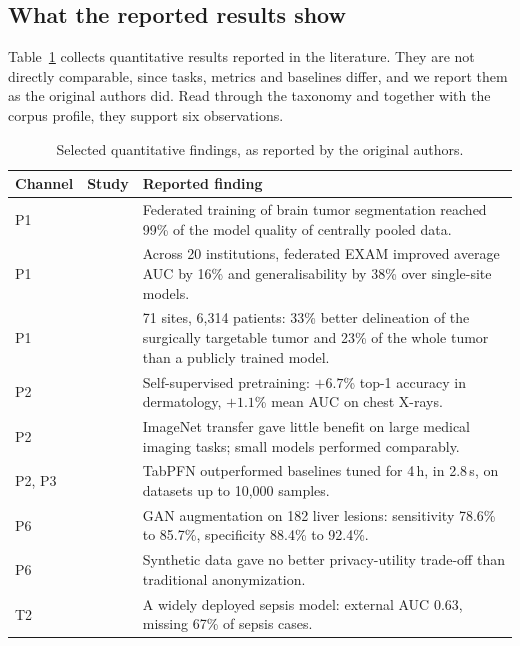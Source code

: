 \documentclass[acmsmall,screen,review]{acmart}
\theoremstyle{acmdefinition}
\begin{document}
\subsection{What the reported results show}\label{sec:S7_2}

Table~\ref{tab:evidence} collects quantitative results reported in the literature. They are not directly comparable, since tasks, metrics and baselines differ, and we report them as the original authors did. Read through the taxonomy and together with the corpus profile, they support six observations.

\begin{table}[t]
\caption{Selected quantitative findings, as reported by the original authors.}
\label{tab:evidence}
\footnotesize
\begin{tabularx}{\linewidth}{@{}p{1.15cm}>{\raggedright\arraybackslash}p{2.6cm}X@{}}
\toprule
Channel & Study & Reported finding\\
\midrule
P1 & \citet{sheller2020federated} & Federated training of brain tumor segmentation reached 99\% of the model quality of centrally pooled data.\\
P1 & \citet{dayan2021federated} & Across 20 institutions, federated EXAM improved average AUC by 16\% and generalisability by 38\% over single-site models.\\
P1 & \citet{pati2022federated} & 71 sites, 6,314 patients: 33\% better delineation of the surgically targetable tumor and 23\% of the whole tumor than a publicly trained model.\\
P2 & \citet{azizi2021big} & Self-supervised pretraining: $+6.7$\% top-1 accuracy in dermatology, $+1.1$\% mean AUC on chest X-rays.\\
P2 & \citet{raghu2019transfusion} & ImageNet transfer gave little benefit on large medical imaging tasks; small models performed comparably.\\
P2, P3 & \citet{hollmann2025accurate} & TabPFN outperformed baselines tuned for 4\,h, in 2.8\,s, on datasets up to 10,000 samples.\\
P6 & \citet{fridadar2018gan} & GAN augmentation on 182 liver lesions: sensitivity 78.6\% to 85.7\%, specificity 88.4\% to 92.4\%.\\
P6 & \citet{stadler2022synthetic} & Synthetic data gave no better privacy-utility trade-off than traditional anonymization.\\
\addlinespace
T2 & \citet{wong2021external} & A widely deployed sepsis model: external AUC 0.63, missing 67\% of sepsis cases.\\

\end{tabularx}
\end{table}
\end{document}
